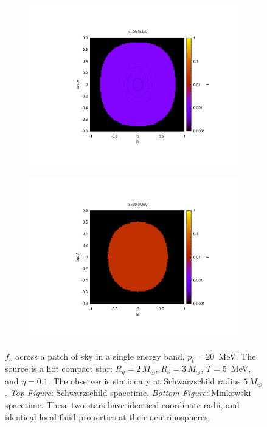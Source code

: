 \begin{figure}
  \centering
  \begin{subfigure}{.8\textwidth}
    \centering
    \includegraphics[width=1\linewidth]{Figures/fnue_Alpha_vs_Beta-asano_fukuyama_gr}
  \end{subfigure}
  \begin{subfigure}{.8\textwidth}
    \centering
    \includegraphics[width=1\linewidth]{Figures/fnue_Alpha_vs_Beta-asano_fukuyama_flat}
  \end{subfigure}
  \caption[$f_\nu$ for a hot compact star: sky map at high energy]{
    $f_\nu$ across a patch of sky in a single energy band, $p_t=20$~MeV.
    The source is a hot compact star: $R_g=2\,M_\odot$, $R_\nu=3\,M_\odot$,
    $T=5$~MeV, and $\eta=0.1$.
    The observer is stationary at Schwarzschild radius $5\,M_\odot$.
    \emph{Top Figure}: Schwarzschild spacetime.
    \emph{Bottom Figure}: Minkowski spacetime.
    These two stars have identical coordinate radii, and identical local fluid
    properties at their neutrinospheres.
  }
  \label{fig:f_hot_ns}
\end{figure}

